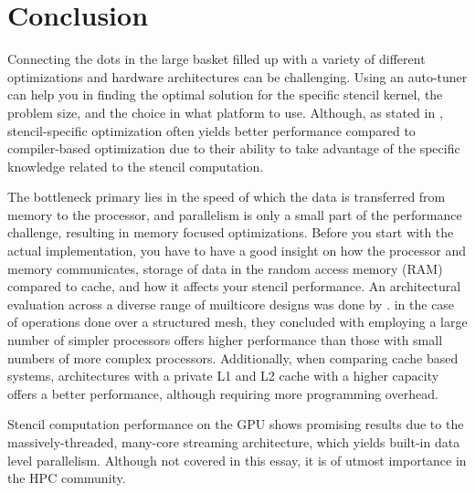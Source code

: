 \chapter{Conclusion} 
Connecting the dots in the large basket filled up with a variety of different optimizations and hardware architectures can be challenging. Using an auto-tuner can help you in finding the optimal solution for the specific stencil kernel, the problem size, and the choice in what platform to use. Although, as stated in \cite{article2}, stencil-specific optimization often yields better performance compared to compiler-based optimization due to their ability to take advantage of the specific knowledge related to the stencil computation. 


The bottleneck primary lies in the speed of which the data is transferred from memory to the processor, and parallelism is only a small part of the performance challenge, resulting in memory focused optimizations. Before you start with the actual implementation, you have to have a good insight on how the processor and memory communicates, storage of data in the random access memory (RAM) compared to cache, and how it affects your stencil performance. An architectural evaluation across a diverse range of muilticore designs was done by \cite{article1}. in the case of operations done over a structured mesh, they concluded with employing a large number of simpler processors offers higher performance than those with small numbers of more complex processors. Additionally, when comparing cache based systems, architectures with a private L1 and L2 cache with a higher capacity offers a better performance, although requiring more programming overhead. 


Stencil computation performance on the GPU shows promising results due to the massively-threaded, many-core streaming architecture, which yields built-in data level parallelism. Although not covered in this essay, it is of utmost importance in the HPC community.



